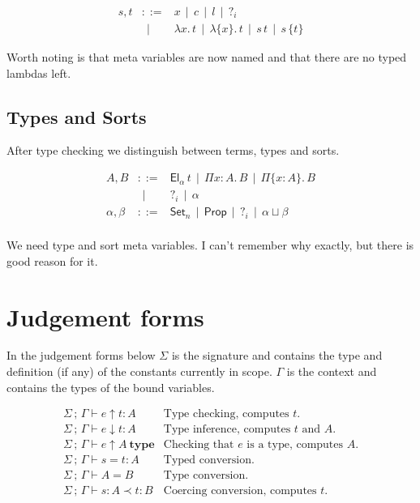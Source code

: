 \documentclass[a4paper,11pt]{article}
\newcommand\Coloneqq{\mathrel{::=}}
\newcommand\OR{~~|~~}
\newcommand\Hid[1]{\{#1\}}
\newcommand\lam[1]{\lambda#1.\,}
\newcommand\hlam[1]{\lam{\Hid{#1}}}
\newcommand\vPi[2]{\Pi#1:#2.\,}
\newcommand\vhPi[2]{\Pi\{#1:#2\}.\,}
\newcommand\Set[1]{\mathsf{Set}_#1}
\newcommand\Prop{\mathsf{Prop}}
\newcommand\el{\mathsf{El}}
\newcommand\El[1]{\el_{#1}\,}
\renewcommand\Check[5]{#1\,;\,#2\vdash#3\uparrow#4:#5}
\newcommand\Infer[5]{#1\,;\,#2\vdash#3\downarrow#4:#5}
\newcommand\IsType[4]{#1\,;\,#2\vdash#3\uparrow#4~\mathbf{type}}
\newcommand\Equal[5]{#1\,;\,#2\vdash#3=#4:#5}
\newcommand\TEqual[4]{#1\,;\,#2\vdash#3=#4}
\newcommand\Expand[6]{#1\,;\,#2\vdash#3:#4\prec#5:#6}
\begin{document}
    \[\begin{array}{lcl}
	s,t & \Coloneqq & x \OR c \OR l \OR ?_i \\
	    & \OR & \lam xt \OR \hlam xt \OR s\,t \OR s\,\Hid t
    \end{array}\]

    Worth noting is that meta variables are now named and that there are no
    typed lambdas left.

\subsection{Types and Sorts}

    After type checking we distinguish between terms, types and sorts.

    \[\begin{array}{lcl}
	A,B & \Coloneqq & \El\alpha t \OR \vPi xAB \OR \vhPi xAB \\
	    & \OR & ?_i \OR \alpha \\
	\alpha,\beta & \Coloneqq & \Set n \OR \Prop \OR ?_i \OR \alpha\sqcup\beta \\
    \end{array}\]

    We need type and sort meta variables. I can't remember why exactly, but
    there is good reason for it.

\section{Judgement forms}

    In the judgement forms below $\Sigma$ is the signature and contains the
    type and definition (if any) of the constants currently in scope. $\Gamma$
    is the context and contains the types of the bound variables.

    \[\begin{array}{ll}
	\Check\Sigma\Gamma etA	    & \mbox{Type checking, computes $t$.} \\
	\Infer\Sigma\Gamma etA	    & \mbox{Type inference, computes $t$ and $A$.} \\
	\IsType\Sigma\Gamma eA	    & \mbox{Checking that $e$ is a type, computes $A$.} \\
	\Equal\Sigma\Gamma stA	    & \mbox{Typed conversion.} \\
	\TEqual\Sigma\Gamma AB	    & \mbox{Type conversion.} \\
	\Expand\Sigma\Gamma sAtB    & \mbox{Coercing conversion, computes $t$.} \\
    \end{array}\]
\end{document}
